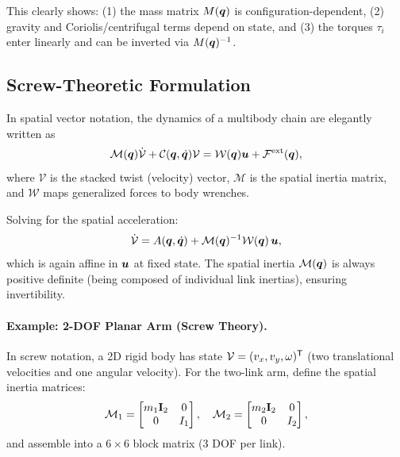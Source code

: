 This clearly shows: (1) the mass matrix $M(\bm{q})$ is configuration-dependent, (2) gravity
and Coriolis/centrifugal terms depend on state, and (3) the torques $\tau_i$ enter linearly
and can be inverted via $M(\bm{q})^{-1}$.

\subsection{Screw-Theoretic Formulation}

In spatial vector notation, the dynamics of a multibody chain are elegantly written as
\begin{equation}
\mathcal{M}(\bm{q})\dot{\mathcal{V}}
+ \mathcal{C}(\bm{q},\dot{\bm{q}})\mathcal{V}
= \mathcal{W}(\bm{q})\bm{u} + \mathcal{F}^{\text{ext}}(\bm{q}),
\label{eq:ch3:screw}
\end{equation}
where $\mathcal{V}$ is the stacked twist (velocity) vector, $\mathcal{M}$ is the spatial
inertia matrix, and $\mathcal{W}$ maps generalized forces to body wrenches.

Solving for the spatial acceleration:
\begin{equation}
\dot{\mathcal{V}} = A(\bm{q},\dot{\bm{q}})
+ \mathcal{M}(\bm{q})^{-1}\mathcal{W}(\bm{q})\,\bm{u},
\label{eq:ch3:screw-affine}
\end{equation}
which is again affine in $\bm{u}$ at fixed state. The spatial inertia $\mathcal{M}(\bm{q})$ is
always positive definite (being composed of individual link inertias), ensuring invertibility.

\paragraph{Example: 2-DOF Planar Arm (Screw Theory).}

In screw notation, a 2D rigid body has state $\mathcal{V} = (v_x, v_y, \omega)^{\mathsf{T}}$ (two
translational velocities and one angular velocity). For the two-link arm, define the
spatial inertia matrices:
\begin{equation}
\mathcal{M}_1 = \begin{bmatrix}
m_1\mathbf{I}_2 & 0 \\
0 & I_1
\end{bmatrix}, \quad
\mathcal{M}_2 = \begin{bmatrix}
m_2\mathbf{I}_2 & 0 \\
0 & I_2
\end{bmatrix},
\end{equation}
and assemble into a $6\times 6$ block matrix (3 DOF per link).

